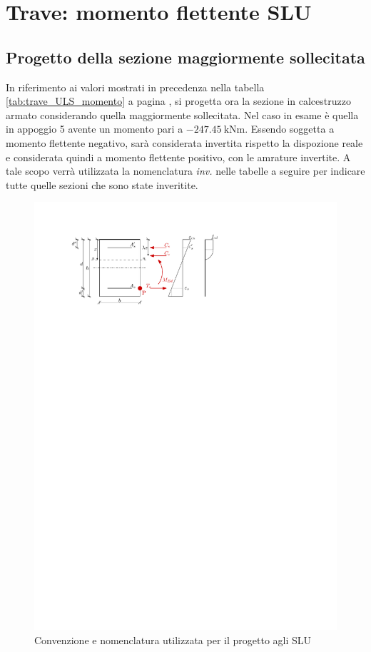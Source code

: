 \chapter{Trave: momento flettente SLU}
\section{Progetto della sezione maggiormente sollecitata}
In riferimento ai valori mostrati in precedenza nella tabella \ref{tab:trave_ULS_momento} a pagina \pageref{tab:trave_ULS_momento}, si progetta ora la sezione in calcestruzzo armato considerando quella maggiormente sollecitata.
Nel caso in esame è quella in appoggio 5 avente un momento pari a $\SI{-247.45}{\kilo\newton\metre}$.
Essendo soggetta a momento flettente negativo, sarà considerata invertita rispetto la dispozione reale e considerata quindi a momento flettente positivo, con le amrature invertite. 
A tale scopo verrà utilizzata la nomenclatura \emph{inv.} nelle tabelle a seguire per indicare tutte quelle sezioni che sono state inveritite.

\begin{figure}[ht]
  \centering
  \includegraphics[height=0.25\textheight]{IMG/IPE_slu_progetto.pdf}
  \caption{Convenzione e nomenclatura utilizzata per il progetto agli SLU}
  \label{fig:slu_progetto}
\end{figure}

